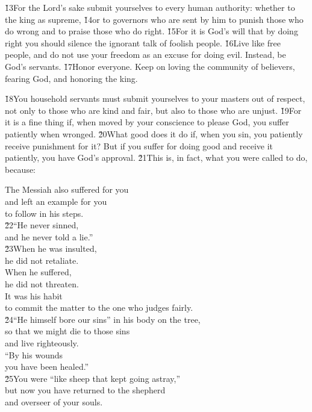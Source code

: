\v{13}For the Lord's sake submit yourselves to every human authority: whether to the king as supreme, \v{14}or to governors who are sent by him to punish those who do wrong and to praise those who do right. \v{15}For it is God's will that by doing right you should silence the ignorant talk of foolish people. \v{16}Live like free people, and do not use your freedom as an excuse for doing evil. Instead, be God's servants. \v{17}Honor everyone. Keep on loving the community of believers, fearing God, and honoring the king.

\v{18}You household servants must submit yourselves to your masters out of respect, not only to those who are kind and fair, but also to those who are unjust. \v{19}For it is a fine thing if, when moved by your conscience to please God, you suffer patiently when wronged. \v{20}What good does it do if, when you sin, you patiently receive punishment for it? But if you suffer for doing good and receive it patiently, you have God's approval. \v{21}This is, in fact, what you were called to do, because:

\begin{poetry}
\poeml The Messiah also suffered for you \\
\poemll    and left an example for you \\
\poemlll       to follow in his steps. \\
\poeml \v{22}``He never sinned, \\
\poemll    and he never told a lie.'' \\
\poeml \v{23}When he was insulted, \\
\poemll    he did not retaliate. \\
\poeml When he suffered, \\
\poemll    he did not threaten. \\
\poeml It was his habit \\
\poemll    to commit the matter to the one who judges fairly. \\
\poeml \v{24}``He himself bore our sins'' in his body on the tree, \\
\poemll    so that we might die to those sins \\
\poemlll       and live righteously. \\
\poeml ``By his wounds \\
\poemll    you have been healed.'' \\
\poeml \v{25}You were ``like sheep that kept going astray,'' \\
\poemll    but now you have returned to the shepherd \\
\poemlll       and overseer of your souls.
\end{poetry}

